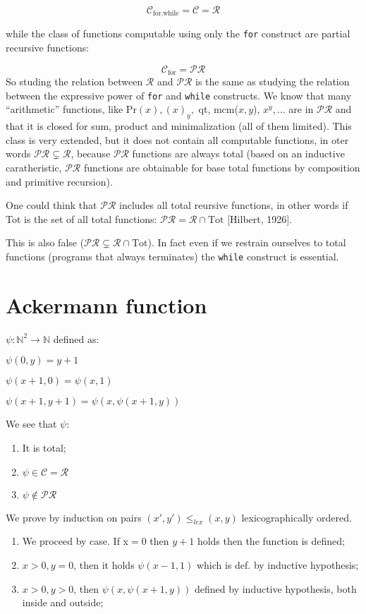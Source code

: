 \documentclass{amsbook}
\newcommand{\nat}{\ensuremath{\mathbb{N}}}
\theoremstyle{definition}
\theoremstyle{remark}
\numberwithin{section}{chapter}
\numberwithin{equation}{chapter}
\begin{document}
\[
  \mathcal{C}_{\text{for,while}} = \mathcal{C} = \mathcal{R}
\]

while the class of functions computable using only the \texttt{for}
construct are partial recursive functions:

\[
  \mathcal{C}_{\text{for}} = \mathcal{PR}
\]
So studing the relation between $\mathcal{R}$ and $\mathcal{PR}$ is
the same as studying the relation between the expressive power of
\texttt{for} and \texttt{while} constructs.  We know that many
``arithmetic'' functions, like Pr$(x), (x)_y,$ qt, mcm($x,y$),
$x^y, \dots$ are in $\mathcal{PR}$ and that it is closed for sum,
product and minimalization (all of them limited). This class is very
extended, but it does not contain all computable functions, in oter
words $\mathcal{PR} \subsetneq \mathcal{R}$, because $\mathcal{PR}$
functions are always total (based on an inductive caratheristic,
$\mathcal{PR}$ functions are obtainable for base total functions by
composition and primitive recursion).

One could think that $\mathcal{PR}$ includes all total reursive
functions, in other words if Tot is the set of all total functions:
$\mathcal{PR} = \mathcal{R} \cap \text{Tot}$ [Hilbert, 1926].

This is also false
($\mathcal{PR} \subsetneq \mathcal{R} \cap \text{Tot}$). In fact even
if we restrain ourselves to total functions (programs that always
terminates) the \texttt{while} construct is essential.

\section{Ackermann function}
$ \psi: \nat^2 \rightarrow \nat $ defined as:

$ \psi(0,y) = y+1 $

$ \psi(x+1,0) = \psi(x,1) $

$ \psi(x+1,y+1) = \psi(x, \psi(x+1, y)) $

We see that $ \psi $:
\begin{enumerate}
	\item It is total;
	\item $ \psi \in \mathcal{C} = \mathcal{R} $
	\item $ \psi \not \in \mathcal{PR} $
\end{enumerate}

We prove by induction on pairs $ (x',y') \leq_{lex} (x,y) $ lexicographically ordered.

\begin{enumerate}
	\item We proceed by case. If x$ = 0$ then $y + 1$ holds then the function is defined;
	\item $ x>0, y=0 $, then it holds $ \psi(x-1,1) $ which is def. by inductive hypothesis;
	\item $ x>0, y>0 $, then $ \psi(x, \psi(x+1, y)) $ defined by inductive hypothesis, both inside and outside;
\end{enumerate}
\end{document}
